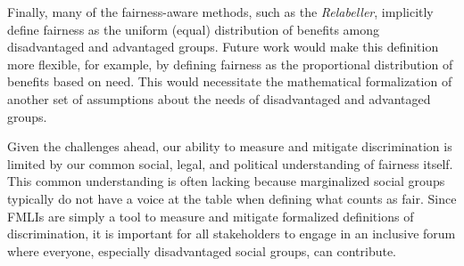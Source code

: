 \documentclass{interact}
\begin{document}
Finally, many of the fairness-aware methods, such as the \emph{Relabeller},
implicitly define fairness as the uniform (equal) distribution of benefits among
disadvantaged and advantaged groups. Future work would make this definition more
flexible, for example, by defining fairness as the proportional distribution of
benefits based on need. This would necessitate the mathematical formalization of
another set of assumptions about the needs of disadvantaged and advantaged
groups.

Given the challenges ahead, our ability to measure and mitigate discrimination
is limited by our common social, legal, and political understanding of fairness
itself. This common understanding is often lacking because marginalized social
groups typically do not have a voice at the table when defining what counts as
fair. Since FMLIs are simply a tool to measure and mitigate formalized
definitions of discrimination, it is important for all stakeholders to engage in
an inclusive forum where everyone, especially disadvantaged social groups, can
contribute.

\nocite{*}

\end{document}

